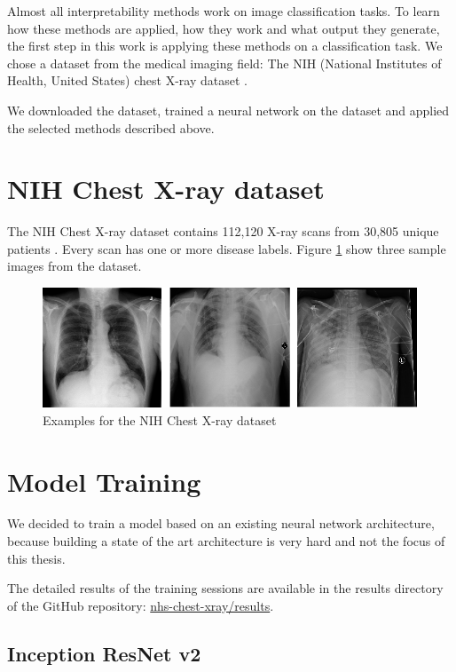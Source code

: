 Almost all interpretability methods work on image classification tasks. To learn how these methods are applied, how they work and what output they generate, the first step in this work is applying these methods on a classification task. We chose a dataset from the medical imaging field: The NIH (National Institutes of Health, United States) chest X-ray dataset \cite{wang2017chestx}.

We downloaded the dataset, trained a neural network on the dataset and applied the selected methods described above.

\section{NIH Chest X-ray dataset}
The NIH Chest X-ray dataset contains 112,120 X-ray scans from 30,805 unique patients \cite{nihchestxraykaggle}. Every scan has one or more disease labels. Figure \ref{chest_xray_sample} show three sample images from the dataset.

\begin{figure}[h]
\centering
\includegraphics[width=14cm]{chapters/03_classification/images/chest-x-ray.png}
\caption{Examples for the NIH Chest X-ray dataset}
\label{chest_xray_sample}
\end{figure}

\section{Model Training}
We decided to train a model based on an existing neural network architecture, because building a state of the art architecture is very hard and not the focus of this thesis.

The detailed results of the training sessions are available in the results directory of the GitHub repository: \href{https://github.com/andef4/thesis-code/tree/master/nhs-chest-xray/results/}{nhs-chest-xray/results}.

\subsection{Inception ResNet v2}

